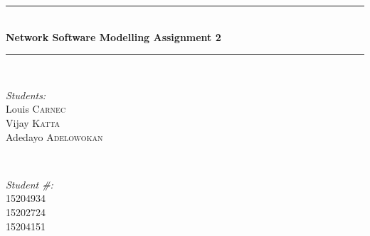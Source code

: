 \documentclass[a4paper,11pt]{article}
\begin{document}
\begin{titlepage}

\newcommand{\HRule}{\rule{\linewidth}{0.5mm}} %

\center %
 


\HRule \\[0.4cm]
{ \huge \bfseries Network Software Modelling Assignment 2}\\[0.4cm] %
\HRule \\[1.5cm]
 

\begin{minipage}{0.4\textwidth}
\begin{flushleft} \large
\emph{Students:}\\
Louis \textsc{Carnec} \\%
Vijay \textsc{Katta}\\
Adedayo \textsc{Adelowokan}  
\end{flushleft}
\end{minipage}
~
\begin{minipage}{0.4\textwidth}
\begin{flushright} \large
\emph{Student \#:} \\
15204934 \\ 15202724 \\15204151 %
\end{flushright}
\end{minipage}\\[4cm]




\end{titlepage}
\end{document}
